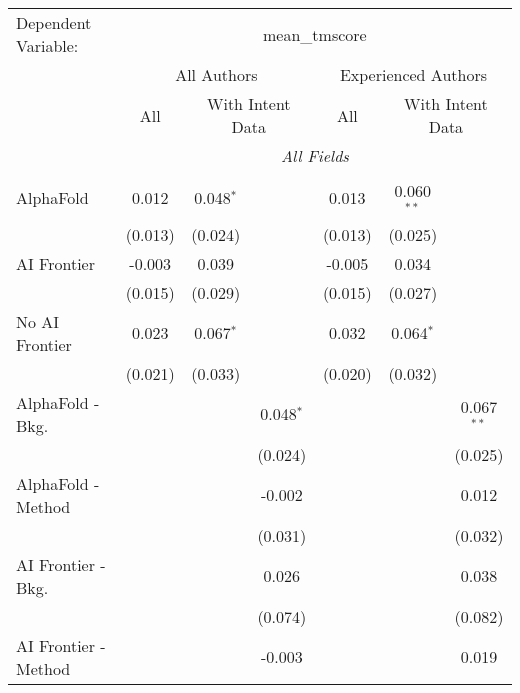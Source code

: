\begingroup
\centering
\begin{tabular}{lcccccc}
   \tabularnewline \midrule \midrule
   Dependent Variable: & \multicolumn{6}{c}{mean\_tmscore}\\
 & \multicolumn{3}{c}{All Authors} & \multicolumn{3}{c}{Experienced Authors} \\
\cmidrule(lr){2-4} \cmidrule(lr){5-7}
 & \multicolumn{1}{c}{All} & \multicolumn{2}{c}{With Intent Data} & \multicolumn{1}{c}{All} & \multicolumn{2}{c}{With Intent Data} \\
\cmidrule(lr){2-2} \cmidrule(lr){3-4} \cmidrule(lr){5-5} \cmidrule(lr){6-7}
 & \multicolumn{6}{c}{\textit{All Fields}} \\ \\
   AlphaFold               & 0.012   & 0.048$^{*}$ &             & 0.013   & 0.060$^{**}$ &   \\   
                           & (0.013) & (0.024)     &             & (0.013) & (0.025)      &   \\   
   AI Frontier             & -0.003  & 0.039       &             & -0.005  & 0.034        &   \\   
                           & (0.015) & (0.029)     &             & (0.015) & (0.027)      &   \\   
   No AI Frontier          & 0.023   & 0.067$^{*}$ &             & 0.032   & 0.064$^{*}$  &   \\   
                           & (0.021) & (0.033)     &             & (0.020) & (0.032)      &   \\   
   AlphaFold - Bkg.        &         &             & 0.048$^{*}$ &         &              & 0.067$^{**}$\\   
                           &         &             & (0.024)     &         &              & (0.025)\\   
   AlphaFold - Method      &         &             & -0.002      &         &              & 0.012\\   
                           &         &             & (0.031)     &         &              & (0.032)\\   
   AI Frontier - Bkg.      &         &             & 0.026       &         &              & 0.038\\   
                           &         &             & (0.074)     &         &              & (0.082)\\   
   AI Frontier - Method    &         &             & -0.003      &         &              & 0.019\\   

\end{tabular}

